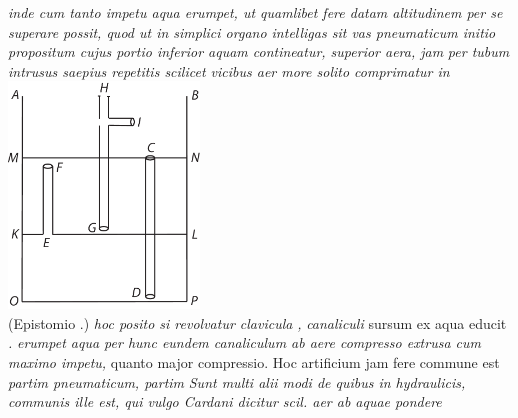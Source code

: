 \textit{inde cum tanto impetu aqua erumpet, ut quamlibet fere datam altitudinem per se superare possit, quod ut in simplici organo intelligas sit vas pneumaticum initio propositum  cujus portio inferior  aquam contineatur, superior  aera, jam}
\noindent
\textit{per tubum intrusus saepius repetitis scilicet vicibus aer more solito comprimatur in} 
\pend
\newpage
\pstart
\centering
\includegraphics[trim = 0mm 0mm 0mm 0mm, clip, width=0.38\textwidth]{images/LH035,14,02_155r-d.pdf}\\
\noindent {}
\pend
\count{}
\count{}
\vspace{1em}
\pstart \noindent (Epistomio \textit{}.)
\textit{hoc posito si revolvatur clavicula }\textit{,}
\textit{canaliculi} sursum ex aqua educit \textit{.}\textit{ erumpet aqua per hunc eundem canaliculum ab aere compresso extrusa cum maximo impetu,} quanto major compressio. Hoc artificium jam fere commune est \textit{partim pneumaticum, partim } \textit{Sunt multi alii modi de quibus in hydraulicis, communis ille est, qui vulgo Cardani\protect{}
dicitur 
scil. aer ab aquae pondere
}
